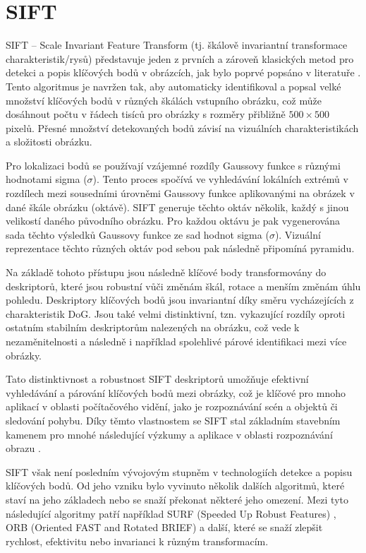 \section{SIFT}
\label{sec:Chapter21}
SIFT -- Scale Invariant Feature Transform (tj. škálově invariantní transformace charakteristik/rysů) představuje jeden z prvních a zároveň klasických metod pro detekci a popis klíčových bodů v obrázcích, jak bylo poprvé popsáno v literatuře \cite{sift}. Tento algoritmus je navržen tak, aby automaticky identifikoval a popsal velké množství klíčových bodů v různých škálách vstupního obrázku, což může dosáhnout počtu v řádech tisíců pro obrázky s rozměry přibližně $500\times500$ pixelů. Přesné množství detekovaných bodů závisí na vizuálních charakteristikách a složitosti obrázku.

Pro lokalizaci bodů se používají vzájemné rozdíly Gaussovy funkce s různými hodnotami sigma ($\sigma$). Tento proces spočívá ve vyhledávání lokálních extrémů v rozdílech mezi sousedními úrovněmi Gaussovy funkce aplikovanými na obrázek v dané škále obrázku (oktávě). SIFT generuje těchto oktáv několik, každý s jinou velikostí daného původního obrázku. Pro každou oktávu je pak vygenerována sada těchto výsledků Gaussovy funkce ze sad hodnot sigma ($\sigma$). Vizuální reprezentace těchto různých oktáv pod sebou pak následně připomíná pyramidu.

Na základě tohoto přístupu jsou následně klíčové body transformovány do deskriptorů, které jsou robustní vůči změnám škál, rotace a menším změnám úhlu pohledu. Deskriptory klíčových bodů jsou invariantní díky směru vycházejících z charakteristik DoG. Jsou také velmi distinktivní, tzn. vykazující rozdíly oproti ostatním stabilním deskriptorům nalezených na obrázku, což vede k nezaměnitelnosti a následně i například spolehlivé párové identifikaci mezi více obrázky.


Tato distinktivnost a robustnost SIFT deskriptorů umožňuje efektivní vyhledávání a párování klíčových bodů mezi obrázky, což je klíčové pro mnoho aplikací v oblasti počítačového vidění, jako je rozpoznávání scén a objektů či sledování pohybu. Díky těmto vlastnostem se SIFT stal základním stavebním kamenem pro mnohé následující výzkumy a aplikace v oblasti rozpoznávání obrazu \cite{sift}.

SIFT však není posledním vývojovým stupněm v technologiích detekce a popisu klíčových bodů. Od jeho vzniku bylo vyvinuto několik dalších algoritmů, které staví na jeho základech nebo se snaží překonat některé jeho omezení. Mezi tyto následující algoritmy patří například SURF (Speeded Up Robust Features) \cite{surf}, ORB (Oriented FAST and Rotated BRIEF) \cite{orb} a další, které se snaží zlepšit rychlost, efektivitu nebo invarianci k různým transformacím.
\endinput